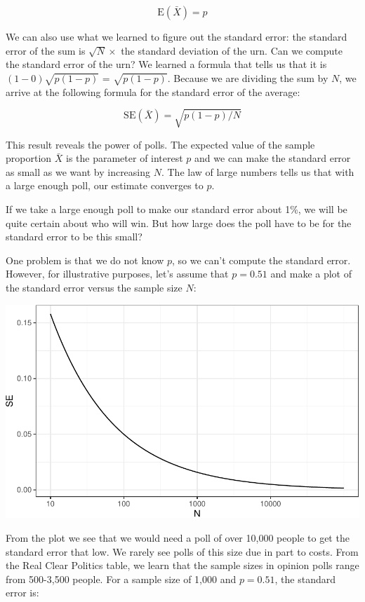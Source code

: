 \documentclass[openany]{book}
\begin{document}
\[
\mbox{E}(\bar{X}) = p
\]

We can also use what we learned to figure out the standard error: the standard error of the sum is \(\sqrt{N} \times\) the standard deviation of the urn. Can we compute the standard error of the urn? We learned a formula that tells us that it is \((1-0) \sqrt{p (1-p)}\) = \(\sqrt{p (1-p)}\). Because we are dividing the sum by \(N\), we arrive at the following formula for the standard error of the average:

\[
\mbox{SE}(\bar{X}) = \sqrt{p(1-p)/N}
\]

This result reveals the power of polls. The expected value of the sample proportion \(\bar{X}\) is the parameter of interest \(p\) and we can make the standard error as small as we want by increasing \(N\). The law of large numbers tells us that with a large enough poll, our estimate converges to \(p\).

If we take a large enough poll to make our standard error about 1\%, we will be quite certain about who will win. But how large does the poll have to be for the standard error to be this small?

One problem is that we do not know \(p\), so we can't compute the standard error. However, for illustrative purposes, let's assume that \(p=0.51\) and make a plot of the standard error versus the sample size \(N\):

\begin{center}\includegraphics[width=0.7\linewidth]{dsbook_files/figure-latex/standard-error-versus-sample-size-1} \end{center}

From the plot we see that we would need a poll of over 10,000 people to get the standard error that low. We rarely see polls of this size due in part to costs. From the Real Clear Politics table, we learn that the sample sizes in opinion polls range from 500-3,500 people. For a sample size of 1,000 and \(p=0.51\), the standard error is:
\end{document}
